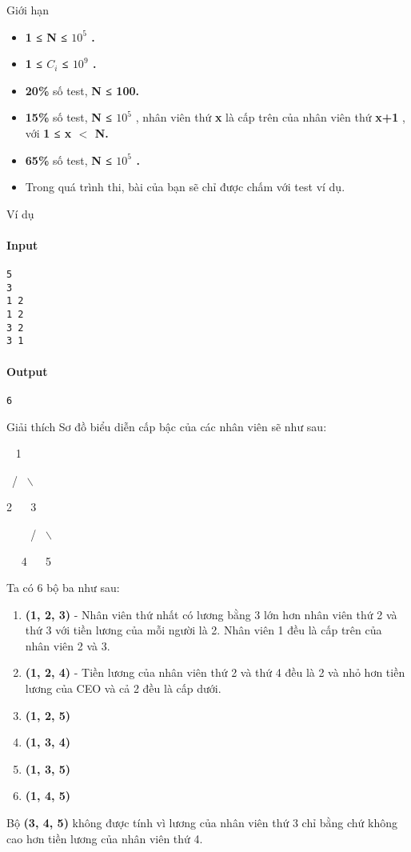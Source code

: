 Giới hạn
\begin{itemize}
	\item \textbf{1 ≤ N ≤ $10^{5}$ . }
	\item \textbf{1 ≤ $C_{i}$ ≤ $10^{9}$ . }
	\item \textbf{20\% } số test, \textbf{ N ≤ 100. }
	\item \textbf{15\% } số test, \textbf{ N ≤ $10^{5}$} , nhân viên thứ \textbf{ x } là cấp trên của nhân viên thứ \textbf{ x+1 } , với \textbf{ 1 ≤ x $<$ N. }
	\item \textbf{65\% } số test, \textbf{ N ≤ $10^{5}$ . }
	\item Trong quá trình thi, bài của bạn sẽ chỉ được chấm với test ví dụ.
\end{itemize}
Ví dụ
\paragraph{Input}
\begin{verbatim}
5
3
1 2
1 2
3 2
3 1\end{verbatim}

\paragraph{Output}
\begin{verbatim}
6\end{verbatim}
Giải thích
Sơ đồ biểu diễn cấp bậc của các nhân viên sẽ như sau:

  1


 /  $\backslash$


2    3


     /  $\backslash$


   4    5

Ta có 6 bộ ba như sau:
\begin{enumerate}
	\item \textbf{(1, 2, 3) } - Nhân viên thứ nhất có lương bằng 3 lớn hơn nhân viên thứ 2 và thứ 3 với tiền lương của mỗi người là 2. Nhân viên 1 đều là cấp trên của nhân viên 2 và 3.
	\item \textbf{(1, 2, 4) } - Tiền lương của nhân viên thứ 2 và thứ 4 đều là 2 và nhỏ hơn tiền lương của CEO và cả 2 đều là cấp dưới.
	\item \textbf{(1, 2, 5) }
	\item \textbf{(1, 3, 4) }
	\item \textbf{(1, 3, 5) }
	\item \textbf{(1, 4, 5) }
\end{enumerate}

Bộ \textbf{ (3, 4, 5) } không được tính vì lương của nhân viên thứ 3 chỉ bằng chứ không cao hơn tiền lương của nhân viên thứ 4.